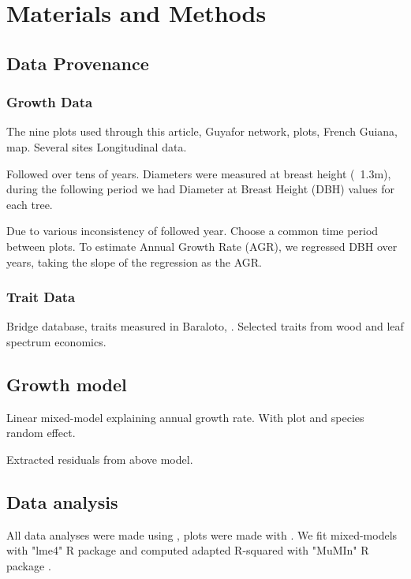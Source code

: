 \section*{Materials and Methods}
\label{sec:M&M}

\subsection*{Data Provenance}

\subsubsection*{Growth Data}
The nine plots used through this article,
Guyafor network, plots,
French Guiana, map. Several sites
Longitudinal data.

Followed over tens of years. Diameters were measured at breast height (~1.3m), during the following period we had Diameter at Breast Height (DBH) values for each tree.

Due to various inconsistency of followed year. Choose a common time period between plots. To estimate Annual Growth Rate (AGR), we regressed DBH over years, taking the slope of the regression as the AGR.

\subsubsection*{Trait Data}

Bridge database, traits measured in Baraloto, \citep{baraloto_functional_2010, baraloto_decoupled_2010}. Selected traits from wood and leaf spectrum economics.

\subsection*{Growth model}

Linear mixed-model explaining annual growth rate. With plot and species random effect.

Extracted residuals from above model.

\subsection*{Data analysis}

All data analyses were made using \citet{R_language}, plots were made with \citet{ggplot2_pkg}. We fit mixed-models with "lme4" R package \citep{lme4_pkg} and computed adapted R-squared \citep{nakagawa_general_2013} with "MuMIn" R package \citep{mumin_pkg}.
